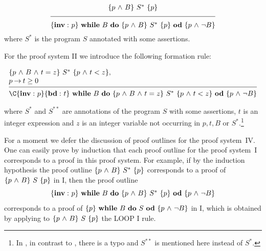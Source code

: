 \documentclass[manuscript, screen, review]{acmart}
\begin{document}
\[
\frac{\raisebox{2mm}{$ \HT{p \A B}{S^*}{p}$}}
            {\raisebox{-2mm}{$\HT{{\bf inv:}\ p}
                 {\WDD{B}{\HT{p \A B}{S^*}{p}}}
                 {p \A \neg B}$}}
\]
where $S^*$ is the program $S$ annotated with some assertions.
\III

For the proof system II we introduce the following formation rule:
\III

\NI
\[
\begin{array}{l}
\HT{p \A B \A t=z}{S^{*}}{p \A t<z},                    \\
p \ra t \geq 0                                          \\
[-\medskipamount]
\hrulefill                                              \\
\C{{\bf inv:}\ p}
\HT{{\bf bd:}\ t}
   {\WDD{B}{\HT{p \A B \A t = z}{S^*}{p \A t<z}}}
   {p \A \neg B}
\end{array}
\]

\NI
where $S^*$ and $S^{**}$ are annotations of
the program $S$ with some assertions, 
$t$ is an integer expression and $z$ is an integer variable
not occurring in $p,t,B$ or $S^{*}$.\footnote{In \cite{ABO09}, in contrast to \cite{ABO90},
there is a typo and $S^{**}$ is mentioned here instead of $S^{*}$.}
\III




For a moment we defer the discussion of proof outlines for the proof
system~IV.  One can easily prove by induction that each proof outline
for the proof system~I corresponds to a proof in this proof
system. For example, if by the induction hypothesis the proof outline
$\mbox{$\{{p \mbox{$\ \wedge\ $} B}\}\ {S^*}\ \{{p}\}$}$ corresponds to a proof of $\mbox{$\{{p \mbox{$\ \wedge\ $} B}\}\ {S}\ \{{p}\}$}$ in
I, then the proof outline
\[
  \HT{{\bf inv:}\ p}{\WDD{B}{\HT{p \A B}{S^*}{p}}}{p \A \neg B}
\]
corresponds to a proof of $\mbox{$\{{p}\}\ {\mbox{$\mbox{{\bf while}\ } {B}\ \mbox{{\bf do}\ } {S}\ \mbox{{\bf od}}$}}\ \{{p \mbox{$\ \wedge\ $} \neg B}\}$}$ in I,
which is obtained by applying to $\mbox{$\{{p \mbox{$\ \wedge\ $} B}\}\ {S}\ \{{p}\}$}$ the LOOP I rule.
\end{document}

